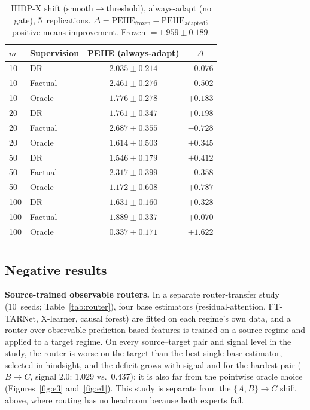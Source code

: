 \documentclass[pdflatex,sn-mathphys-num]{sn-jnl}
\newcommand{\PEHE}{\mathrm{PEHE}}
\begin{document}
\begin{table}[htbp]
\centering
\caption{IHDP-X shift (smooth$\to$threshold), always-adapt (no gate), 5~replications. $\Delta=\PEHE_{\mathrm{frozen}}-\PEHE_{\mathrm{adapted}}$; positive means improvement. Frozen $=1.959\pm0.189$.}
\label{tab:ihdp}
\begin{tabular}{@{}llcc@{}}
\toprule
$m$ & Supervision & PEHE (always-adapt) & $\Delta$\\
\midrule
10  & DR      & $2.035\pm0.214$ & $-0.076$\\
10  & Factual & $2.461\pm0.276$ & $-0.502$\\
10  & Oracle  & $1.776\pm0.278$ & $+0.183$\\
20  & DR      & $1.761\pm0.347$ & $+0.198$\\
20  & Factual & $2.687\pm0.355$ & $-0.728$\\
20  & Oracle  & $1.614\pm0.503$ & $+0.345$\\
50  & DR      & $1.546\pm0.179$ & $+0.412$\\
50  & Factual & $2.317\pm0.399$ & $-0.358$\\
50  & Oracle  & $1.172\pm0.608$ & $+0.787$\\
100 & DR      & $1.631\pm0.160$ & $+0.328$\\
100 & Factual & $1.889\pm0.337$ & $+0.070$\\
100 & Oracle  & $0.337\pm0.171$ & $+1.622$\\
\botrule
\end{tabular}
\end{table}


\subsection{Negative results}
\label{sec:neg}
\medskip\noindent\textbf{Source-trained observable routers.} In a separate router-transfer study (10~seeds; Table~\ref{tab:router}), four base estimators (residual-attention, FT-TARNet, X-learner, causal forest) are fitted on each regime's own data, and a router over observable prediction-based features is trained on a source regime and applied to a target regime. On every source--target pair and signal level in the study, the router is worse on the target than the best single base estimator, selected in hindsight, and the deficit grows with signal and for the hardest pair ($B\to C$, signal $2.0$: $1.029$ vs.\ $0.437$); it is also far from the pointwise oracle choice (Figures~\ref{fig:e3} and~\ref{fig:e1}). This study is separate from the $\{A,B\}\to C$ shift above, where routing has no headroom because both experts fail.
\end{document}

